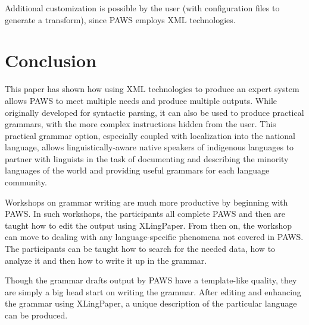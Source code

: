 Additional customization is possible by the user (with configuration files to generate a transform), since PAWS employs XML technologies.

\section{Conclusion}\label{sConc}
This paper has shown how using XML technologies to produce an expert system allows PAWS to meet multiple needs and produce multiple outputs. While originally developed for syntactic parsing, it can also be used to produce practical grammars, with the more complex instructions hidden from the user. This practical grammar option, especially coupled with localization into the national language, allows linguistically-aware native speakers of indigenous languages to partner with linguists in the task of documenting and describing the minority languages of the world and providing useful grammars for each language community.

Workshops on grammar writing are much more productive by beginning with PAWS. In such workshops, the participants all complete PAWS and then are taught how to edit the output using XLingPaper. From then on, the workshop can move to dealing with any language-specific phenomena not covered in PAWS. The participants can be taught how to search for the needed data, how to analyze it and then how to write it up in the grammar.

Though the grammar drafts output by PAWS have a template-like quality, they are simply a big head start on writing the grammar. After editing and enhancing the grammar using XLingPaper, a unique description of the particular language can be produced.

\setcounter{secnumdepth}{3}
